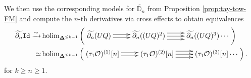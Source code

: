  We then use the corresponding models for $\widetilde{\mathbb{D}_n}$ from Proposition \ref{prop:tay-tow-FM} and compute the $n$-th derivatives via cross effects to obtain equivalences \begin{align} \label{eq:model-for-nth-deriv}
    \widetilde{\partial_n} \Id \xrightarrow{\sim} & 
    \holim_{\bdel^{\leq k-1}} \left( \xymatrix{
    \widetilde{\partial_n} (UQ) \ar@<-.5ex>[r] \ar@<.5ex>[r] &
    \widetilde{\partial_n} ((UQ)^2) \ar@<-1ex>[r] \ar[r] \ar@<1ex>[r] & 
    \widetilde{\partial_n} ((UQ)^3) \cdots
    }\right) 
    \\
    \simeq & \holim_{\bdel^{\leq k-1}} \left(\xymatrix{ 
     (\tau_1\Cal{O})^{(1)}[n] \ar@<.5 ex>[r] \ar@<-.5ex>[r] &
    (\tau_1\Cal{O})^{(2)}[n] \ar@<1 ex>[r] \ar[r] \ar@<-1 ex>[r] &
    (\tau_1\Cal{O})^{(3)}[n] \cdots }\right). \nonumber
\end{align}
for $k\geq n\geq 1$.

